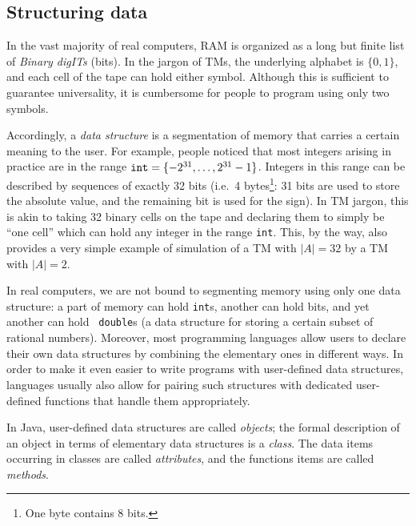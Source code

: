 \documentclass[a4paper]{book}
\theoremstyle{changebreak}                %
\begin{document}
\subsection{Structuring data}
\label{s:computation:datastructures}
In the vast majority of real computers, RAM is organized as
a long but finite list of {\it Binary digITs} (bits). In
the jargon of TMs, the underlying alphabet is
$\{0,1\}$, and each cell of the tape can hold either
symbol. Although this is sufficient to guarantee
universality, it is cumbersome for people to program using only two
symbols.

Accordingly, a {\it data structure} is a
segmentation of memory that carries a certain meaning to
the user. For example, people noticed that most integers arising in
practice are in the range $\mbox{\tt
  int}=\{-2^{31},\ldots,2^{31}-1\}$. Integers in this
range can be described by sequences of exactly 32 bits (i.e.~4
bytes\footnote{One byte contains 8 bits.}: 31 bits are used to store
the absolute value, and the remaining bit is used for the sign). In TM
jargon, this is akin to taking 32 binary cells on the tape
and declaring them to simply be ``one cell'' which can hold any
integer in the range {\tt int}.  This, by the way, also provides a
very simple example of simulation of a TM with
$|A|=32$ by a TM with $|A|=2$.

In real computers, we are not bound to segmenting memory using only
one data structure: a part of memory can hold
{\tt int}s, another can hold bits, and yet another can hold {\tt
  double}s (a data structure for storing a certain
subset of rational numbers). Moreover, most programming languages
allow users to declare their own data structures by combining the
elementary ones in different ways. In
order to make it even easier to write programs with user-defined data
structures,
languages\label{language} usually also allow for pairing such
structures with dedicated user-defined
functions that handle them appropriately.

In Java, user-defined data structures are called {\it
  objects}; the formal description of an object in terms
of elementary data structures is a {\it class}. The data
items occurring in classes are called {\it
  attributes}, and the functions items are called
{\it methods}.
\end{document}
